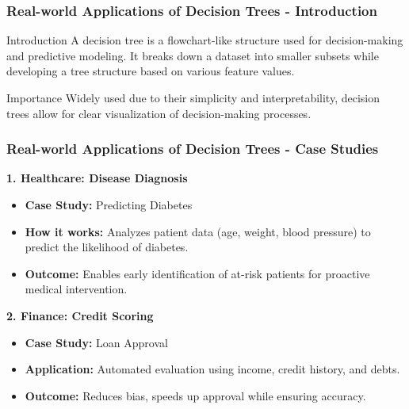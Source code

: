 \documentclass[aspectratio=169]{beamer}
\begin{document}
\begin{frame}[fragile]
    \frametitle{Real-world Applications of Decision Trees - Introduction}
    
    \begin{block}{Introduction}
        A decision tree is a flowchart-like structure used for decision-making and predictive modeling. 
        It breaks down a dataset into smaller subsets while developing a tree structure based on various feature values.
    \end{block}
    
    \begin{block}{Importance}
        Widely used due to their simplicity and interpretability, decision trees allow for clear visualization of decision-making processes.
    \end{block}
\end{frame}

\begin{frame}[fragile]
    \frametitle{Real-world Applications of Decision Trees - Case Studies}
    
    \textbf{1. Healthcare: Disease Diagnosis}
    \begin{itemize}
        \item \textbf{Case Study:} Predicting Diabetes
        \item \textbf{How it works:} Analyzes patient data (age, weight, blood pressure) to predict the likelihood of diabetes.
        \item \textbf{Outcome:} Enables early identification of at-risk patients for proactive medical intervention.
    \end{itemize}
    
    \textbf{2. Finance: Credit Scoring}
    \begin{itemize}
        \item \textbf{Case Study:} Loan Approval
        \item \textbf{Application:} Automated evaluation using income, credit history, and debts.
        \item \textbf{Outcome:} Reduces bias, speeds up approval while ensuring accuracy.
    \end{itemize}
\end{frame}
\end{document}

